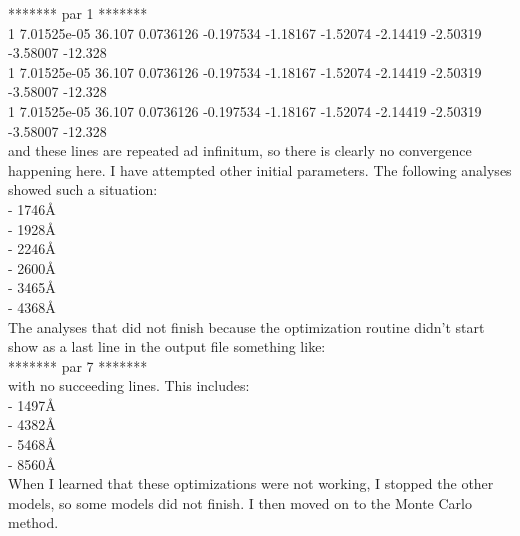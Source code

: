 \documentclass[11pt,letterpaper]{article}
\begin{document}
******* par 1 *******\\
1 7.01525e-05 36.107 0.0736126 -0.197534 -1.18167 -1.52074 -2.14419 -2.50319 -3.58007 -12.328 \\
1 7.01525e-05 36.107 0.0736126 -0.197534 -1.18167 -1.52074 -2.14419 -2.50319 -3.58007 -12.328 \\
1 7.01525e-05 36.107 0.0736126 -0.197534 -1.18167 -1.52074 -2.14419 -2.50319 -3.58007 -12.328 \\

and these lines are repeated ad infinitum, so there is clearly no convergence happening here. I have attempted other initial parameters. The following analyses showed such a situation:\\
    - 1746\AA\\
    - 1928\AA\\
    - 2246\AA\\
    - 2600\AA\\
    - 3465\AA\\
    - 4368\AA\\

The analyses that did not finish because the optimization routine didn't start show as a last line in the output file something like:\\
******* par 7 *******\\

with no succeeding lines. This includes:\\
- 1497\AA\\
- 4382\AA\\
- 5468\AA\\
- 8560\AA\\

When I learned that these optimizations were not working, I stopped the other models, so some models did not finish. I then moved on to the Monte Carlo method.
\end{document}
